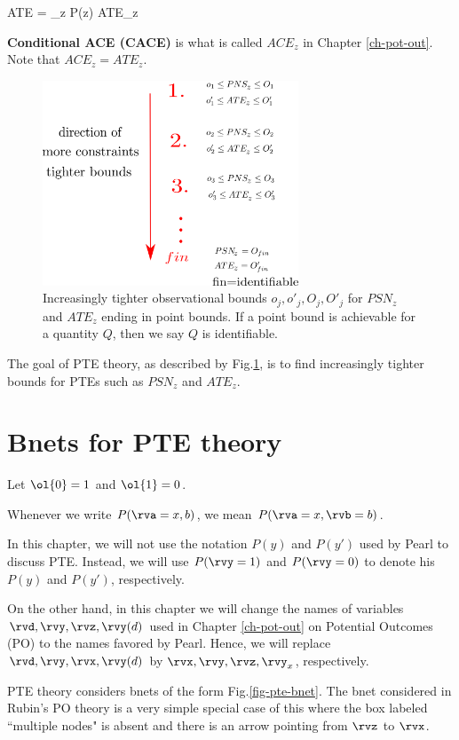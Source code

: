 \beq
ATE = \sum_z P(z) ATE_z
\eeq

{\bf Conditional ACE 
(CACE)} is what
is called
$ACE_z$ in Chapter \ref{ch-pot-out}.
Note that
$ACE_z=ATE_z$.

\begin{figure}[h!]
\centering
\includegraphics[width=3in]
{personalized/personalized-goal.png}
\caption{Increasingly
tighter observational bounds
$o_j, o'_j, O_j, O'_j$ 
for $PSN_z$ and $ATE_z$
ending in point bounds.
If a point bound is achievable
 for a quantity $Q$,
then we say $Q$
is identifiable.} 
\label{fig-personalized-goal}
\end{figure}

The goal of PTE theory, as
described by 
Fig.\ref{fig-personalized-goal}, is
to find
increasingly 
tighter bounds for
PTEs such as 
$PSN_z$ and $ATE_z$.


\section{Bnets for PTE theory}
\quad

Let $\ol{0}=1$ and $\ol{1}=0$.

Whenever we write $P(\rva=x, b)$, 
we mean $P(\rva=x, \rvb=b)$.

In this chapter, we will
not use the notation
$P(y)$ and $P(y')$
used by Pearl to
discuss PTE.
Instead, we will
use $P(\rvy=1)$ and
$P(\rvy=0)$
to denote his 
$P(y)$ and $P(y')$, respectively. 


On the other hand, 
in this chapter
we will change the names 
of variables $\rvd, \rvy, \rvz, \rvy(d)$
used 
in Chapter \ref{ch-pot-out} on Potential
Outcomes (PO)
to the names favored by Pearl.
Hence, we will replace
$\rvd, \rvy, \rvx, \rvy(d)$
by
$\rvx, \rvy, \rvz, \rvy_x$,
respectively.



PTE theory considers bnets of the form
Fig.\ref{fig-pte-bnet}.
The bnet considered in Rubin's
PO theory
is a very simple special case
of this where the box
labeled ``multiple nodes"
is absent and there is an
arrow pointing
from $\rvz$ to $\rvx$.


